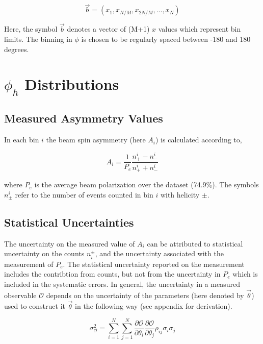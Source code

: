 \begin{equation}
  \vec{b} = (x_1, x_{N/M}, x_{2N/M}, ..., x_N)
\end{equation}

Here, the symbol $\vec{b}$ denotes a vector of (M+1) $x$ values which represent bin limits.  The binning in $\phi$ is chosen to be regularly spaced between -180 and 180 degrees.    

\section{$\phi_h$ Distributions}
\subsection*{Measured Asymmetry Values}
In each bin $i$ the beam spin asymmetry (here $A_i$) is calculated according to, 

\begin{equation}
  A_i = \frac{1}{P_e} \frac{n_+^i - n_-^i}{n_+^i + n_-^i}
\end{equation}

where $P_e$ is the average beam polarization over the dataset (74.9\%).  The symbols $n_{\pm}^{i}$ refer to the number of events counted in bin $i$ with helicity $\pm$.  


\subsection*{Statistical Uncertainties}
The uncertainty on the measured value of $A_i$ can be attributed to statistical uncertainty on the counts $n_{i}^{\pm}$, and the uncertainty associated with the measurement of $P_e$.  The statistical uncertainty reported on the measurement includes the contribtion from counts, but not from the uncertainty in $P_e$ which is included in the systematic errors.  In general, the uncertainty in a measured observable $\mathcal{O}$ depends on the uncertainty of the parameters (here denoted by $\vec{\theta}$) used to construct it $\vec{\theta}$ in the following way (see appendix for derivation).

\begin{equation}
  \label{eqn:error-propagation}
  \sigma_{\mathcal{O}}^2 = \sum_{i=1}^{N} \sum_{j=1}^{N} \frac{\partial \mathcal{O}}{\partial \theta_i} \frac{\partial \mathcal{O}}{\partial \theta_j} \rho_{ij} \sigma_i \sigma_j 
\end{equation}
  
